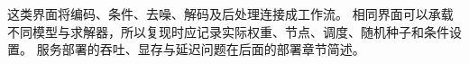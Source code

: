 这类界面将编码、条件、去噪、解码及后处理连接成工作流。
相同界面可以承载不同模型与求解器，所以复现时应记录实际权重、节点、调度、随机种子和条件设置。
服务部署的吞吐、显存与延迟问题在后面的部署章节简述。
